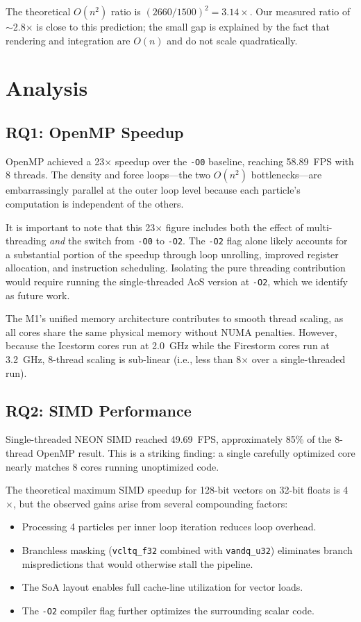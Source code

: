 \documentclass[12pt, a4paper]{article}
\begin{document}
The theoretical $O(n^2)$ ratio is $(2660/1500)^2 = 3.14\times$. Our measured ratio of $\sim$2.8$\times$ is close to this prediction; the small gap is explained by the fact that rendering and integration are $O(n)$ and do not scale quadratically.

\section{Analysis}

\subsection{RQ1: OpenMP Speedup}
OpenMP achieved a 23$\times$ speedup over the \texttt{-O0} baseline, reaching 58.89~FPS with 8 threads. The density and force loops---the two $O(n^2)$ bottlenecks---are embarrassingly parallel at the outer loop level because each particle's computation is independent of the others.

It is important to note that this 23$\times$ figure includes both the effect of multi-threading \emph{and} the switch from \texttt{-O0} to \texttt{-O2}. The \texttt{-O2} flag alone likely accounts for a substantial portion of the speedup through loop unrolling, improved register allocation, and instruction scheduling. Isolating the pure threading contribution would require running the single-threaded AoS version at \texttt{-O2}, which we identify as future work.

The M1's unified memory architecture contributes to smooth thread scaling, as all cores share the same physical memory without NUMA penalties. However, because the Icestorm cores run at 2.0~GHz while the Firestorm cores run at 3.2~GHz, 8-thread scaling is sub-linear (i.e., less than 8$\times$ over a single-threaded run).

\subsection{RQ2: SIMD Performance}
Single-threaded NEON SIMD reached 49.69~FPS, approximately 85\% of the 8-thread OpenMP result. This is a striking finding: a single carefully optimized core nearly matches 8 cores running unoptimized code.

The theoretical maximum SIMD speedup for 128-bit vectors on 32-bit floats is 4$\times$, but the observed gains arise from several compounding factors:
\begin{itemize}
    \item Processing 4 particles per inner loop iteration reduces loop overhead.
    \item Branchless masking (\texttt{vcltq\_f32} combined with \texttt{vandq\_u32}) eliminates branch mispredictions that would otherwise stall the pipeline.
    \item The SoA layout enables full cache-line utilization for vector loads.
    \item The \texttt{-O2} compiler flag further optimizes the surrounding scalar code.
\end{itemize}
\end{document}

